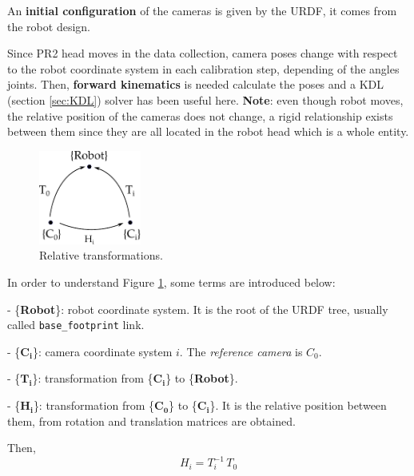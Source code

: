 An \textbf{initial configuration} of the cameras is given by the URDF, it comes from the robot design.

Since PR2 head moves in the data collection, camera poses change with respect to the robot coordinate system in each calibration step, depending of the angles joints. Then, \textbf{forward kinematics} is needed calculate the poses and a KDL (section \ref{sec:KDL}) solver has been useful here.
\textbf{Note}: even though robot moves, the relative position of the cameras does not change, a rigid relationship exists between them since they are all located in the robot head which is a whole entity.

\begin{figure}[!htbp]
 \centering
 \includegraphics[width=0.3\textwidth]{images/initialization.pdf}
 \caption{Relative transformations.}
 \label{fig:initialization}
\end{figure}

\noindent
In order to understand Figure \ref{fig:initialization}, some terms are introduced below:
\begin{itemize*}
 \item[-] \{\textbf{Robot}\}: robot coordinate system. It is the root of the URDF tree, usually called \texttt{base\_footprint} link.

 \item[-]  \{$\mathbf{C_i}$\}: camera coordinate system $i$. The \textit{reference camera} is $C_0$.

 \item[-]  \{$\mathbf{T_i}$\}: transformation from  \{$\mathbf{C_i}$\} to \{\textbf{Robot}\}.

 \item[-] \{$\mathbf{H_i}$\}: transformation from  \{$\mathbf{C_0}$\} to  \{$\mathbf{C_i}$\}. It is the relative position between them, from rotation and translation matrices are obtained.
\end{itemize*}

Then,
\begin{equation}
 H_i = T_i^{-1} \, T_0
\end{equation}

